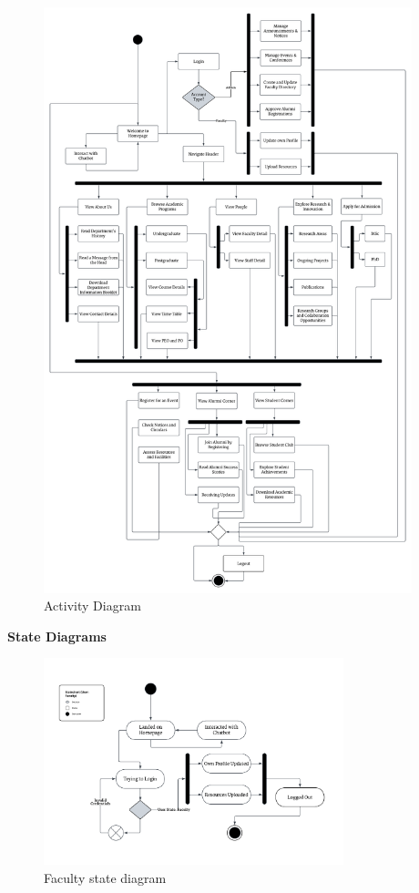 \documentclass[11pt]{article}
\begin{document}
\begin{customItemize}
\begin{figure}[H]
        \includegraphics[height=17cm]{Activity Diagram.png}
        \caption{Activity Diagram}
    \end{figure}
    \FloatBarrier
    \newpage
    \item \textbf{State Diagrams}
    \FloatBarrier
    \begin{figure}[H]
        \centering
        \includegraphics[height=6cm]{StateChart - Faculty.png}
        \caption{Faculty state diagram}
        \label{fig: Faculty state diagram}

\end{figure}
\end{customItemize}
\end{document}
